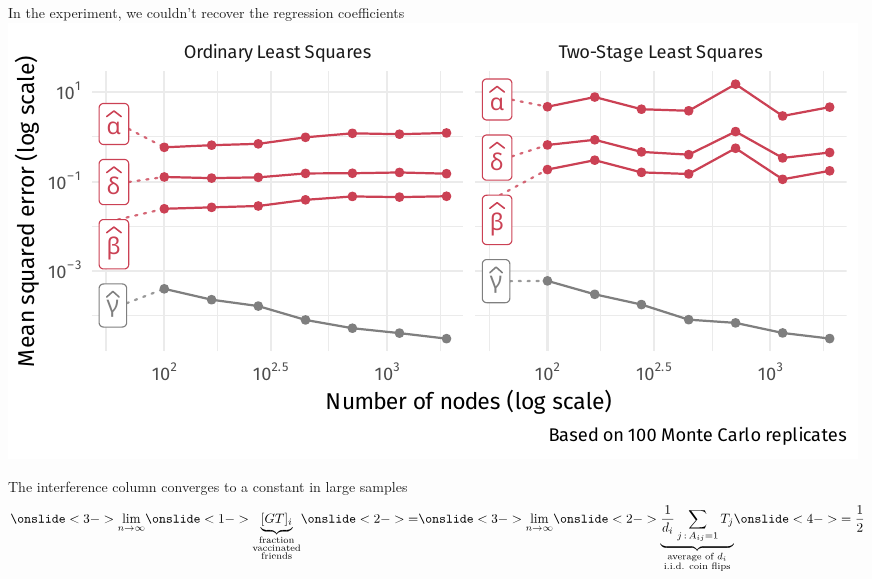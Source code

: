 \documentclass[aspectratio=169]{beamer}
\theoremstyle{remark}
\begin{document}
\begin{frame}{In the experiment, we couldn't recover the regression coefficients}
    \vspace{3mm}
    \centering
    \includegraphics{./figures/simulations/defense-mse.pdf}
\end{frame}

\begin{frame}{The interference column converges to a constant in large samples}
    \centering
    \Large
    \vspace{6mm}
    \begin{equation*}
        \onslide<3->{
            \lim_{n \to \infty}
        }
        \onslide<1->{
            \underbrace{[GT]_i}_{\substack{\text{fraction} \\ \text{vaccinated} \\ \text{friends}}}
        }
        \onslide<2->{=}
        \onslide<3->{
            \lim_{n \to \infty}
        }
        \onslide<2->{
            \underbrace{
                \frac{1}{d_i} \sum_{j \, : \, A_{ij} = 1} T_j
            }_{\substack{\text{average of $d_i$}           \\ \text{i.i.d. coin flips}}}
        }
        \onslide<4->{
            = \frac 12   
        }
    \end{equation*} \\
    \normalsize
    \vspace{6mm}
\end{frame}
\end{document}
